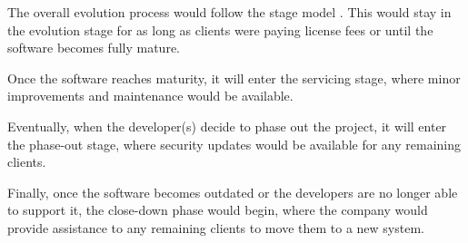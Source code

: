 \documentclass[a4paper]{article}
\begin{document}
The overall evolution process would follow the stage model \cite{stageModel}. This would stay in the evolution stage for as long as clients were paying license fees or until the software becomes fully mature.

Once the software reaches maturity, it will enter the servicing stage, where minor improvements and maintenance would be available.

Eventually, when the developer(s) decide to phase out the project, it will enter the phase-out stage, where security updates would be available for any remaining clients.

Finally, once the software becomes outdated or the developers are no longer able to support it, the close-down phase would begin, where the company would provide assistance to any remaining clients to move them to a new system.
\end{document}
